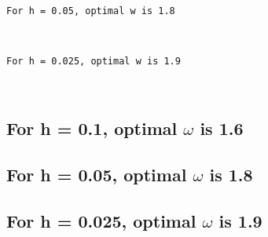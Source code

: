 \documentclass[11pt]{article}
\begin{document}
    \begin{center}
    \end{center}
    { \hspace*{\fill} \\}
    
    \begin{Verbatim}[commandchars=\\\{\}]
For h = 0.05, optimal w is 1.8
    \end{Verbatim}

    \begin{center}
    \end{center}
    { \hspace*{\fill} \\}
    
    \begin{Verbatim}[commandchars=\\\{\}]
For h = 0.025, optimal w is 1.9
    \end{Verbatim}

    \begin{center}
    \end{center}
    { \hspace*{\fill} \\}
    
    \hypertarget{for-h-0.1-optimal-omega-is-1.6}{%
\subsection{\texorpdfstring{For h = 0.1, optimal \(\omega\) is
1.6}{For h = 0.1, optimal \textbackslash{}omega is 1.6}}\label{for-h-0.1-optimal-omega-is-1.6}}

\hypertarget{for-h-0.05-optimal-omega-is-1.8}{%
\subsection{\texorpdfstring{For h = 0.05, optimal \(\omega\) is
1.8}{For h = 0.05, optimal \textbackslash{}omega is 1.8}}\label{for-h-0.05-optimal-omega-is-1.8}}

\hypertarget{for-h-0.025-optimal-omega-is-1.9}{%
\subsection{\texorpdfstring{For h = 0.025, optimal \(\omega\) is
1.9}{For h = 0.025, optimal \textbackslash{}omega is 1.9}}\label{for-h-0.025-optimal-omega-is-1.9}}
\end{document}
